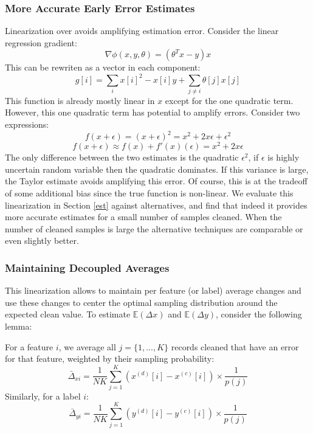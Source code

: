 \subsubsection{More Accurate Early Error Estimates}\label{acc}
Linearization over avoids amplifying estimation error.
Consider the linear regression gradient:
\[
\nabla\phi(x,y,\theta) = (\theta^Tx - y)x
\]
This can be rewriten as a vector in each component:
\[
g[i] = \sum_{i} x[i]^2-x[i]y + \sum_{j \ne i} \theta[j]x[j]
\]
This function is already mostly linear in $x$ except for the one quadratic term.
However, this one quadratic term has potential to amplify errors.
Consider two expressions:
\[
f(x+\epsilon) = (x+\epsilon)^2 = x^2 + 2x\epsilon + \epsilon^2
\]
\[
f(x+\epsilon) \approx f(x) + f'(x)(\epsilon) = x^2 + 2x\epsilon
\]
The only difference between the two estimates is the quadratic $\epsilon^2$, if $\epsilon$ is highly uncertain random variable then the quadratic dominates.
If this variance is large, the Taylor estimate avoids amplifying this error.
Of course, this is at the tradeoff of some additional bias since the true function is non-linear.
We evaluate this linearization in Section \ref{est} against alternatives, and find that indeed it provides more accurate estimates for a small number of samples cleaned.
When the number of cleaned samples is large the alternative techniques are comparable or even slightly better.


\subsubsection{Maintaining Decoupled Averages}
This linearization allows \sys to maintain per feature (or label) average changes and use these changes to center the optimal sampling distribution around the expected clean value.
To estimate $\mathbb{E}(\Delta x)$ and $\mathbb{E}(\Delta y)$, consider the following lemma:
\begin{lemma}
For a feature $i$, we average all $j=\{1,...,K\}$ records cleaned that have an error for that feature, weighted by their sampling probability:
\[
\bar{\Delta}_{xi} = \frac{1}{NK}\sum_{j=1}^K (x^{(d)}[i]-x^{(c)}[i])\times \frac{1}{p(j)}
\]
Similarly, for a label $i$:
\[
\bar{\Delta}_{yi} = \frac{1}{NK}\sum_{j=1}^K (y^{(d)}[i]-y^{(c)}[i])\times \frac{1}{p(j)}
\]
\end{lemma}

